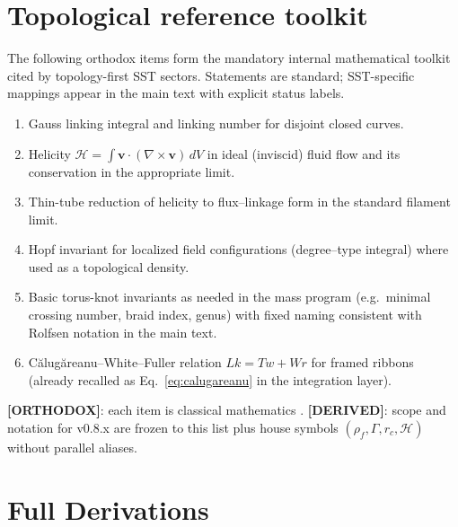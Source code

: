 \documentclass[11pt]{article}
\theoremstyle{definition}
\theoremstyle{plain}
\theoremstyle{remark}
\newcommand{\rhoF}{{\rho_{\!f}}}
\newcommand{\rc}{{r_c}}
\begin{document}
    \section{Topological reference toolkit}
        \label{sec:appendix_topology_toolkit}

        The following orthodox items form the mandatory internal mathematical toolkit cited by topology-first SST sectors. Statements are standard; SST-specific mappings appear in the main text with explicit status labels.

        \begin{enumerate}
            \item Gauss linking integral and linking number for disjoint closed curves.
            \item Helicity $\mathcal{H}=\int \mathbf{v}\cdot(\nabla\times\mathbf{v})\,dV$ in ideal (inviscid) fluid flow and its conservation in the appropriate limit.
            \item Thin-tube reduction of helicity to flux--linkage form in the standard filament limit.
            \item Hopf invariant for localized field configurations (degree--type integral) where used as a topological density.
            \item Basic torus-knot invariants as needed in the mass program (e.g.\ minimal crossing number, braid index, genus) with fixed naming consistent with Rolfsen notation in the main text.
            \item C\u{a}lug\u{a}reanu--White--Fuller relation $Lk=Tw+Wr$ for framed ribbons (already recalled as Eq.~\eqref{eq:calugareanu} in the integration layer).
        \end{enumerate}

        \textbf{[ORTHODOX]}: each item is classical mathematics \cite{Moffatt1969,White1969,Batchelor1967}. \textbf{[DERIVED]}: scope and notation for v0.8.x are frozen to this list plus house symbols $(\rhoF,\Gamma,\rc,\mathcal{H})$ without parallel aliases.

    \section{Full Derivations}
        \label{sec:appendix_derivations}
\end{document}
